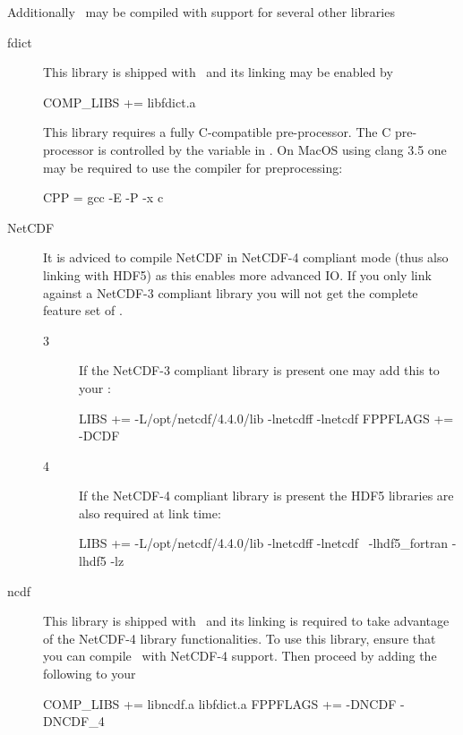 Additionally \siesta\ may be compiled with support for several other
libraries
\begin{description}

  \item[fdict] %
  This library is shipped with \siesta\ and its linking may be enabled
  by 
  \begin{shellexample}
    COMP_LIBS += libfdict.a
  \end{shellexample}
  This library requires a fully C-compatible pre-processor. The C
  pre-processor is controlled by the  variable in
  . 
  On MacOS using clang 3.5 one may be required to use the 
  compiler for preprocessing:
  \begin{shellexample}
    CPP = gcc -E -P -x c
  \end{shellexample}


  \item[NetCDF] %
  It is adviced to compile NetCDF in NetCDF-4 compliant mode (thus
  also linking with HDF5) as this enables more advanced IO. If you
  only link against a NetCDF-3 compliant library you will not get the
  complete feature set of \siesta.

  \begin{description}
    \item[3]%
    If the NetCDF-3 compliant library is present one may add this to
    your :
\begin{shellexample}
  LIBS += -L/opt/netcdf/4.4.0/lib -lnetcdff -lnetcdf
  FPPFLAGS += -DCDF
\end{shellexample}

    \item[4]%
    If the NetCDF-4 compliant library is present the HDF5 libraries
    are also required at link time:
\begin{shellexample}
  LIBS += -L/opt/netcdf/4.4.0/lib -lnetcdff -lnetcdf \
            -lhdf5_fortran -lhdf5 -lz
\end{shellexample}

  \end{description}


  \item[ncdf] %
  This library is shipped with \siesta\ and its linking is required to
  take advantage of the NetCDF-4 library functionalities. To use this
  library, ensure that you can compile \siesta\ with NetCDF-4
  support. Then proceed by adding the following to your 
  \begin{shellexample}
    COMP_LIBS += libncdf.a libfdict.a
    FPPFLAGS += -DNCDF -DNCDF_4
  \end{shellexample}


\end{description}
